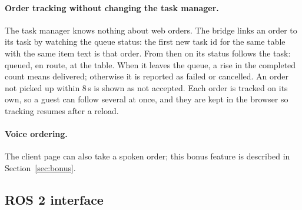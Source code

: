 \documentclass[11pt,a4paper]{article}
\begin{document}
\paragraph{Order tracking without changing the task manager.} The task
manager knows nothing about web orders. The bridge links an order to its
task by watching the queue status: the first new task id for the same
table with the same item text is that order. From then on its status
follows the task: queued, en route, at the table. When it leaves the
queue, a rise in the completed count means delivered; otherwise it is
reported as failed or cancelled. An order not picked up within 8\,s is
shown as not accepted. Each order is tracked on its own, so a guest can
follow several at once, and they are kept in the browser so tracking
resumes after a reload.

\paragraph{Voice ordering.} The client page can also take a spoken order; this bonus feature is described in Section~\ref{sec:bonus}.

\subsection{ROS 2 interface}
\end{document}
